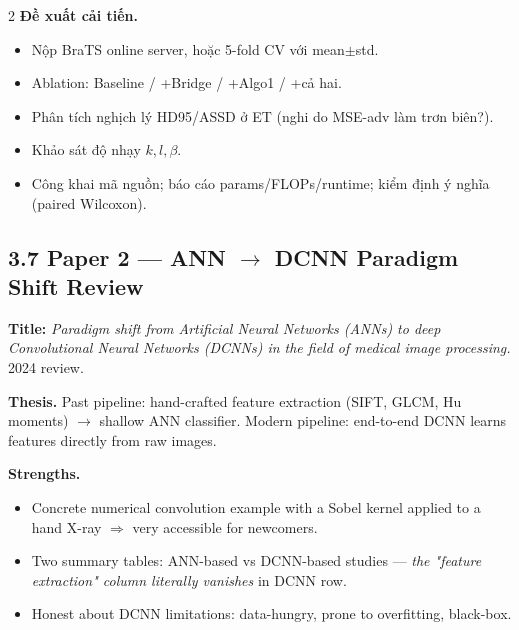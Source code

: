 \begin{paracol}{2}
\textbf{Đề xuất cải tiến.}
\begin{itemize}[leftmargin=*,nosep]
  \item Nộp BraTS online server, hoặc 5-fold CV với mean$\pm$std.
  \item Ablation: Baseline / +Bridge / +Algo1 / +cả hai.
  \item Phân tích nghịch lý HD95/ASSD ở ET (nghi do MSE-adv làm trơn biên?).
  \item Khảo sát độ nhạy $k,l,\beta$.
  \item Công khai mã nguồn; báo cáo params/FLOPs/runtime; kiểm định ý nghĩa (paired Wilcoxon).
\end{itemize}

\switchcolumn*

\subsection*{3.7 Paper 2 — ANN $\to$ DCNN Paradigm Shift Review}
\textbf{Title:} \emph{Paradigm shift from Artificial Neural Networks (ANNs) to deep Convolutional Neural Networks (DCNNs) in the field of medical image processing.} 2024 review.

\textbf{Thesis.} Past pipeline: hand-crafted feature extraction (SIFT, GLCM, Hu moments) $\to$ shallow ANN classifier. Modern pipeline: end-to-end DCNN learns features directly from raw images.

\textbf{Strengths.}
\begin{itemize}[leftmargin=*,nosep]
  \item Concrete numerical convolution example with a Sobel kernel applied to a hand X-ray $\Rightarrow$ very accessible for newcomers.
  \item Two summary tables: ANN-based vs DCNN-based studies — \emph{the "feature extraction" column literally vanishes} in DCNN row.
  \item Honest about DCNN limitations: data-hungry, prone to overfitting, black-box.
\end{itemize}


\end{paracol}
